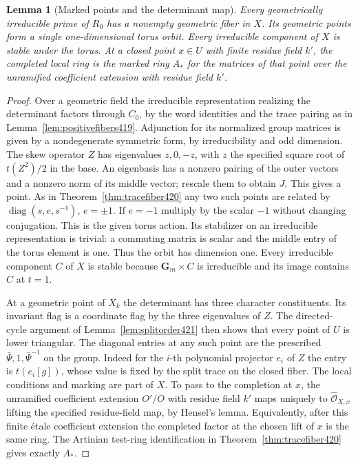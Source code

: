 \documentclass[a4paper,11pt]{article}
\newtheorem{lemma}[proposition]{Lemma}
\theoremstyle{definition}
\theoremstyle{remark}
\numberwithin{equation}{section}
\begin{document}
\begin{lemma}[Marked points and the determinant map]\leavevmode
\label{lem:matrices423}
Every geometrically irreducible prime of \(R_0\) has a nonempty
geometric fiber in \(X\). Its geometric points form a single
one-dimensional torus orbit. Every irreducible component of
\(X\) is stable under the torus. At a closed point \(x\in U\)
with finite residue field \(k'\), the completed local ring is
the marked ring \(A_*\) for the matrices of that point over the
unramified coefficient extension with residue field \(k'\).
\end{lemma}
\begin{proof}
Over a geometric field the irreducible representation realizing
the determinant factors through \(C_0\), by the word identities
and the trace pairing as in Lemma~\ref{lem:positivefibers419}.
Adjunction for its normalized group matrices is given by a
nondegenerate symmetric form, by irreducibility and odd
dimension. The skew operator \(Z\) has eigenvalues \(z,0,-z\),
with \(z\) the specified square root of \(t(Z^2)/2\) in the
base. An eigenbasis has a nonzero pairing of the outer vectors
and a nonzero norm of its middle vector; rescale them to
obtain \(J\). This gives a point. As in
Theorem~\ref{thm:tracefiber420} any two such points are related
by \(\operatorname{diag}(s,e,s^{-1})\), \(e=\pm1\). If \(e=-1\)
multiply by the scalar \(-1\) without changing conjugation.
This is the given torus action. Its stabilizer on an irreducible
representation is trivial: a commuting matrix is scalar and
the middle entry of the torus element is one. Thus the orbit
has dimension one. Every irreducible component \(C\) of \(X\)
is stable because \(\mathbf G_m\times C\) is irreducible
and its image contains \(C\) at \(t=1\).

At a geometric point of \(X_k\) the determinant has three
character constituents. Its invariant flag is a coordinate flag
by the three eigenvalues of \(Z\). The directed-cycle argument
of Lemma~\ref{lem:splitorder421} then shows that every point of
\(U\) is lower triangular. The diagonal entries at any such point
are the prescribed \(\bar\Psi,1,\bar\Psi^{-1}\) on the group.
Indeed for the \(i\)-th polynomial projector \(e_i\) of \(Z\)
the entry is \(t(e_i[g])\), whose value is fixed by the split
trace on the closed fiber. The local conditions and marking
are part of \(X\). To pass to the completion at \(x\), the
unramified coefficient extension \(O'/O\) with residue field
\(k'\) maps uniquely to \(\widehat{\mathcal O}_{X,x}\) lifting
the specified residue-field map, by Hensel's lemma. Equivalently,
after this finite \'{e}tale coefficient extension the completed
factor at the chosen lift of \(x\) is the same ring. The
Artinian test-ring identification in
Theorem~\ref{thm:tracefiber420} gives exactly \(A_*\).
\end{proof}
\end{document}
